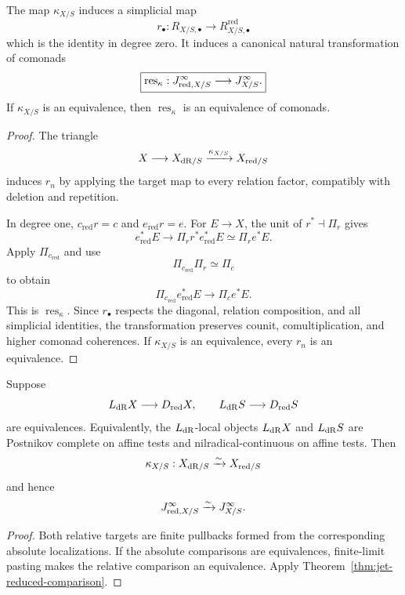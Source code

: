 \begin{theorem}
\label{thm:jet-reduced-comparison}
The map $\kappa_{X/S}$ induces a simplicial map
\[
    r_\bullet:R_{X/S,\bullet}
    \longrightarrow
    R^{\mathrm{red}}_{X/S,\bullet}
\]
which is the identity in degree zero.  It induces a canonical natural transformation of comonads
\[
\boxed{
    \operatorname{res}_{\kappa}:
    J^{\infty}_{\mathrm{red},X/S}
    \longrightarrow
    J^{\infty}_{X/S}.
}
\]
If $\kappa_{X/S}$ is an equivalence, then $\operatorname{res}_{\kappa}$ is an equivalence of comonads.
\end{theorem}

\begin{proof}
The triangle
\[
    X\longrightarrow X_{\mathrm{dR}/S}
    \xrightarrow{\kappa_{X/S}}
    X_{\mathrm{red}/S}
\]
induces $r_n$ by applying the target map to every relation factor, compatibly with deletion and repetition.

In degree one, $c_{\mathrm{red}}r=c$ and $e_{\mathrm{red}}r=e$.  For $E\to X$, the unit of $r^*\dashv\Pi_r$ gives
\[
    e_{\mathrm{red}}^*E
    \longrightarrow
    \Pi_r r^*e_{\mathrm{red}}^*E
    \simeq
    \Pi_r e^*E.
\]
Apply $\Pi_{c_{\mathrm{red}}}$ and use
\[
    \Pi_{c_{\mathrm{red}}}\Pi_r\simeq\Pi_c
\]
to obtain
\[
    \Pi_{c_{\mathrm{red}}}e_{\mathrm{red}}^*E
    \longrightarrow
    \Pi_ce^*E.
\]
This is $\operatorname{res}_{\kappa}$.  Since $r_\bullet$ respects the diagonal, relation composition, and all simplicial identities, the transformation preserves counit, comultiplication, and higher comonad coherences.  If $\kappa_{X/S}$ is an equivalence, every $r_n$ is an equivalence.
\end{proof}

\begin{corollary}
\label{cor:jet-reduced-convergence}
Suppose
\[
    L_{\mathrm{dR}}X\longrightarrow D_{\mathrm{red}} X,
    \qquad
    L_{\mathrm{dR}}S\longrightarrow D_{\mathrm{red}} S
\]
are equivalences.  Equivalently, the $L_{\mathrm{dR}}$-local objects $L_{\mathrm{dR}}X$ and $L_{\mathrm{dR}}S$ are Postnikov complete on affine tests and nilradical-continuous on affine tests.  Then
\[
    \kappa_{X/S}:X_{\mathrm{dR}/S}\xrightarrow{\sim}X_{\mathrm{red}/S}
\]
and hence
\[
    J^{\infty}_{\mathrm{red},X/S}
    \xrightarrow{\sim}
    J^{\infty}_{X/S}.
\]
\end{corollary}

\begin{proof}
Both relative targets are finite pullbacks formed from the corresponding absolute localizations.  If the absolute comparisons are equivalences, finite-limit pasting makes the relative comparison an equivalence.  Apply Theorem~\ref{thm:jet-reduced-comparison}.
\end{proof}

